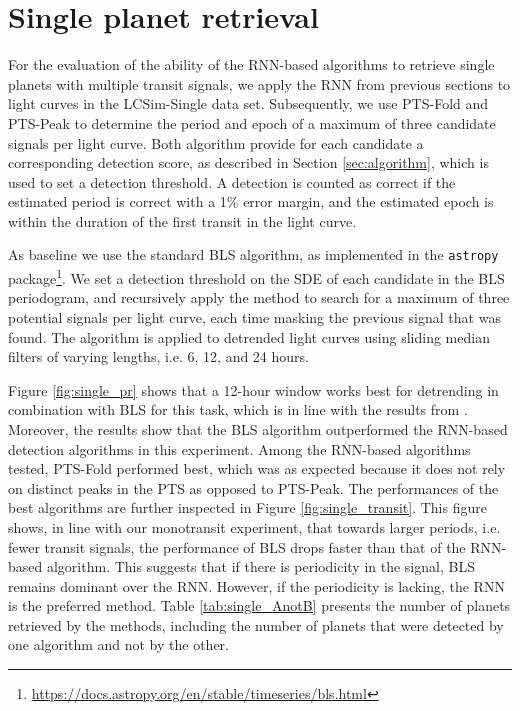 \section{Single planet retrieval}
\label{sec:singles}

For the evaluation of the ability of the RNN-based algorithms to retrieve single planets with multiple transit signals, we apply the RNN from previous sections to light curves in the LCSim-Single data set. Subsequently, we use PTS-Fold and PTS-Peak to determine the period and epoch of a maximum of three candidate signals per light curve. Both algorithm provide for each candidate a corresponding detection score, as described in Section \ref{sec:algorithm}, which is used to set a detection threshold. A detection is counted as correct if the estimated period is correct with a 1\% error margin, and the estimated epoch is within the duration of the first transit in the light curve.

As baseline we use the standard BLS algorithm, as implemented in the \texttt{astropy} package\footnote{\url{https://docs.astropy.org/en/stable/timeseries/bls.html}}. We set a detection threshold on the SDE of each candidate in the BLS periodogram, and recursively apply the method to search for a maximum of three potential signals per light curve, each time masking the previous signal that was found. The algorithm is applied to detrended light curves using sliding median filters of varying lengths, i.e. 6, 12, and 24 hours.

Figure \ref{fig:single_pr} shows that a 12-hour window works best for detrending in combination with BLS for this task, which is in line with the results from \cite{hippke2019wotan}. Moreover, the results show that the BLS algorithm outperformed the RNN-based detection algorithms in this experiment. Among the RNN-based algorithms tested, PTS-Fold performed best, which was as expected because it does not rely on distinct peaks in the PTS as opposed to PTS-Peak. The performances of the best algorithms are further inspected in Figure \ref{fig:single_transit}. This figure shows, in line with our monotransit experiment, that towards larger periods, i.e. fewer transit signals, the performance of BLS drops faster than that of the RNN-based algorithm. This suggests that if there is periodicity in the signal, BLS remains dominant over the RNN. However, if the periodicity is lacking, the RNN is the preferred method. Table \ref{tab:single_AnotB} presents the number of planets retrieved by the methods, including the number of planets that were detected by one algorithm and not by the other.

